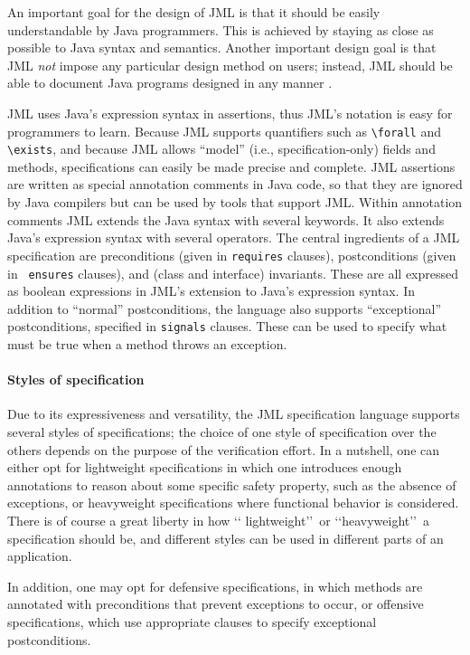 An important goal for the design of JML is that it should be easily
understandable by Java programmers. This is achieved by staying as
close as possible to Java syntax and semantics.  Another important
design goal is that JML {\em not} impose any particular design method
on users; instead, JML should be able to document Java programs
designed in any manner \cite{Leavens-Baker-Ruby03}.

JML uses Java's expression syntax in assertions,
thus JML's notation is easy for programmers to learn.  
Because JML supports quantifiers such as
\verb_\forall_ and \verb_\exists_, and because JML allows ``model''
(i.e., specification-only) fields and methods, specifications can
easily be made precise and complete.
JML assertions are written as special
annotation comments in Java code,
so that they are ignored by Java compilers but can be used
by tools that support JML\@.  Within annotation comments JML extends the
Java syntax with several keywords.  It also extends Java's expression syntax with several
operators.
The central ingredients of a JML specification are preconditions
(given in {\tt requires} clauses), postconditions (given in {\tt
  ensures} clauses), and (class and interface) invariants.  These are
all expressed as boolean expressions in JML's extension to Java's
expression syntax.
In addition to ``normal'' postconditions, the language also supports
``exceptional'' postconditions, specified in {\tt signals} clauses.
These can be used to specify what must be true when a method throws an
exception. 

\paragraph*{Styles of specification}
Due to its expressiveness and versatility, the JML specification
language supports several styles of specifications; the choice of one
style of specification over the others depends on the purpose of the
verification effort. In a nutshell, one can either opt for lightweight
specifications in which one introduces enough annotations to reason
about some specific safety property, such as the absence of
exceptions, or heavyweight specifications where functional behavior is
considered. There is of course a great liberty in how \lq\lq
lightweight\rq\rq\ or \lq\lq heavyweight\rq\rq\ a specification should
be, and different styles can be used in different parts of an
application.

In addition, one may opt for defensive specifications, in which methods
are annotated with preconditions that prevent exceptions to occur, or
offensive specifications, which use appropriate clauses to specify 
exceptional postconditions.

